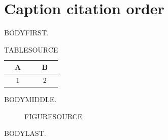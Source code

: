\documentclass{uestcthesis}
\begin{document}
\uestcfrontmatter
\uestctableofcontents
\uestclistoffigures
\uestclistoftables

\uestcmainmatter
\chapter{Caption citation order}
\noindent BODYFIRST\cite{lecun2015deep}.

\begin{table}[H]
    \centering
    \caption{TABLESOURCE\cite{vaswani2017attention}}
    \label{tab:caption-citation-test}
    \begin{tabular}{cc}
        \toprule
        A & B \\
        \midrule
        1 & 2 \\
        \bottomrule
    \end{tabular}
\end{table}

\noindent BODYMIDDLE\citep{kingma2014adam}.

\begin{figure}[H]
    \centering
    \fbox{\rule{0pt}{1cm}\rule{3cm}{0pt}}
    \caption{FIGURESOURCE\cite{lamport1994latex}}
    \label{fig:caption-citation-test}
\end{figure}

\noindent BODYLAST\cite{zhang2020third}.
\uestcprintbibliography
\end{document}
